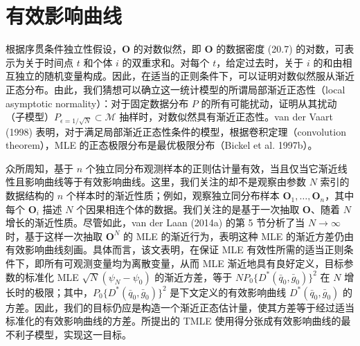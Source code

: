 \section{有效影响曲线}

根据序贯条件独立性假设，$\mathbf O$ 的对数似然，即 $\mathbf O$ 的数据密度 (20.7) 的对数，可表示为关于时间点 $t$ 和个体 $i$ 的双重求和。对每个 $t$，给定过去时，关于 $i$ 的和由相互独立的随机变量构成。因此，在适当的正则条件下，可以证明对数似然服从渐近正态分布。由此，我们猜想可以确立这一统计模型的所谓局部渐近正态性（local asymptotic normality）：对于固定数据分布 $P$ 的所有可能扰动，证明从其扰动（子模型）$P_{\epsilon=1/\sqrt N}\subset\mathcal M$ 抽样时，对数似然具有渐近正态性。van der Vaart (1998) 表明，对于满足局部渐近正态性条件的模型，根据卷积定理（convolution theorem），MLE 的正态极限分布是最优极限分布（Bickel et al. 1997b）。

众所周知，基于 $n$ 个独立同分布观测样本的正则估计量有效，当且仅当它渐近线性且影响曲线等于有效影响曲线。这里，我们关注的却不是观察由参数 $N$ 索引的数据结构的 $n$ 个样本时的渐近性质；例如，观察独立同分布样本 $\mathbf O_1,\ldots,\mathbf O_n$，其中每个 $\mathbf O_i$ 描述 $N$ 个因果相连个体的数据。我们关注的是基于一次抽取 $\mathbf O$、随着 $N$ 增长的渐近性质。尽管如此，van der Laan (2014a) 的第 5 节分析了当 $N\to\infty$ 时，基于这样一次抽取 $\mathbf O^N$ 的 MLE 的渐近行为，表明这种 MLE 的渐近方差仍由有效影响曲线刻画。具体而言，该文表明，在保证 MLE 有效性所需的适当正则条件下，即所有可观测变量均为离散变量，从而 MLE 渐近地具有良好定义，目标参数的标准化 MLE $\sqrt N(\psi_N-\psi_0)$ 的渐近方差，等于 $NP_0\{D^*(\bar q_0,\bar g_0)\}^2$ 在 $N$ 增长时的极限；其中，$P_0\{D^*(\bar q_0,\bar g_0)\}^2$ 是下文定义的有效影响曲线 $D^*(\bar q_0,\bar g_0)$ 的方差。因此，我们的目标仍应是构造一个渐近正态估计量，使其方差等于经过适当标准化的有效影响曲线的方差。所提出的 TMLE 使用得分张成有效影响曲线的最不利子模型，实现这一目标。

